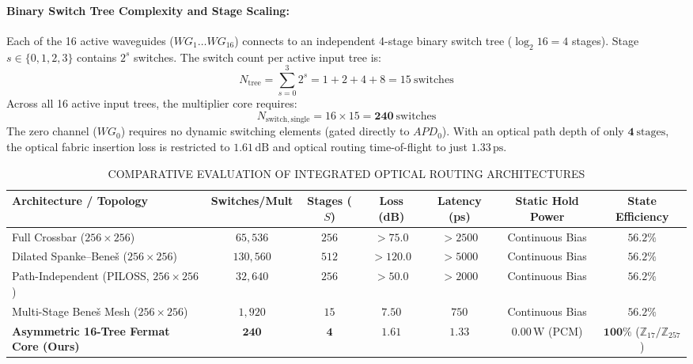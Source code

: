 \documentclass[journal]{IEEEtran}
\begin{document}
\paragraph{\textbf{Binary Switch Tree Complexity and Stage Scaling:}}
Each of the 16 active waveguides ($WG_1 \dots WG_{16}$) connects to an independent 4-stage binary switch tree ($\log_2 16 = 4$ stages). Stage $s \in \{0, 1, 2, 3\}$ contains $2^s$ switches. The switch count per active input tree is:
\begin{equation}
N_{\mathrm{tree}} = \sum_{s=0}^{3} 2^s = 1 + 2 + 4 + 8 = 15~\mathrm{switches}
\end{equation}
Across all 16 active input trees, the multiplier core requires:
\begin{equation}
N_{\mathrm{switch,single}} = 16 \times 15 = \mathbf{240~\mathrm{switches}}
\end{equation}
The zero channel ($WG_0$) requires no dynamic switching elements (gated directly to $APD_0$). With an optical path depth of only $\mathbf{4~\mathrm{stages}}$, the optical fabric insertion loss is restricted to $1.61\,\mathrm{dB}$ and optical routing time-of-flight to just $1.33\,\mathrm{ps}$.

\begin{table}[htbp]
\centering
\footnotesize
\setlength{\tabcolsep}{4pt}
\renewcommand{\arraystretch}{1.15}
\caption{COMPARATIVE EVALUATION OF INTEGRATED OPTICAL ROUTING ARCHITECTURES}
\label{tab:table5}
\begin{tabular*}{\textwidth}{@{\extracolsep{\fill}}lcccccc@{}}
\toprule
\textbf{Architecture / Topology} & \textbf{Switches/Mult} & \textbf{Stages ($S$)} & \textbf{Loss (dB)} & \textbf{Latency (ps)} & \textbf{Static Hold Power} & \textbf{State Efficiency} \\
\midrule
Full Crossbar ($256 \times 256$) & $65{,}536$ & $256$ & $>75.0$ & $>2500$ & Continuous Bias & $56.2\%$ \\
Dilated Spanke--Bene\v{s} ($256 \times 256$) & $130{,}560$ & $512$ & $>120.0$ & $>5000$ & Continuous Bias & $56.2\%$ \\
Path-Independent (PILOSS, $256 \times 256$) & $32{,}640$ & $256$ & $>50.0$ & $>2000$ & Continuous Bias & $56.2\%$ \\
Multi-Stage Bene\v{s} Mesh ($256 \times 256$) & $1{,}920$ & $15$ & $7.50$ & $750$ & Continuous Bias & $56.2\%$ \\
\textbf{Asymmetric 16-Tree Fermat Core (Ours)} & $\mathbf{240}$ & $\mathbf{4}$ & $\mathbf{1.61}$ & $\mathbf{1.33}$ & $\mathbf{0.00\,\mathrm{W}}$ (PCM) & $\mathbf{100\%}$ ($\mathbb{Z}_{17} / \mathbb{Z}_{257}$) \\
\bottomrule
\end{tabular*}
\end{table}
\end{document}
